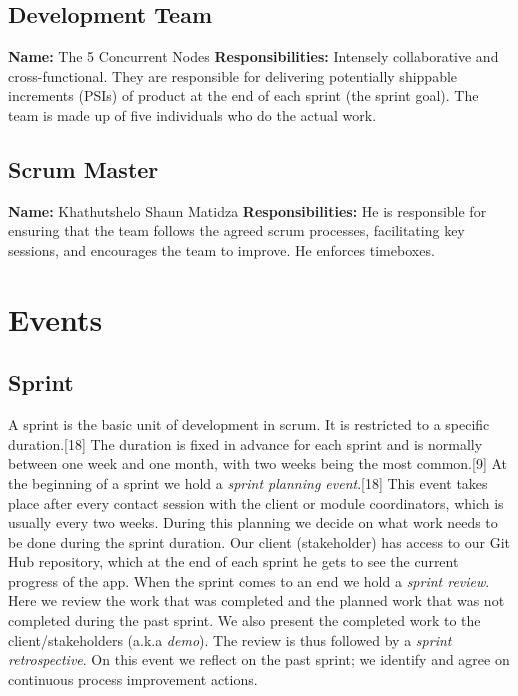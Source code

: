 \documentclass[hidelinks, 12pt, oneside]{article}
\begin{document}
 	\subsection{Development Team}
 	\textbf{Name:} The 5 Concurrent Nodes\newline
	\textbf{Responsibilities:} Intensely collaborative and cross-functional. They are responsible for delivering potentially shippable increments (PSIs) of product at the end of each sprint (the sprint goal). 
	The team
	is made up of five individuals who do the actual work.
	\subsection{Scrum Master}
 	\textbf{Name:} Khathutshelo Shaun Matidza\newline
	\textbf{Responsibilities:} He is responsible for ensuring that the team follows the agreed scrum processes, facilitating key sessions, and encourages 
	the team to improve. He enforces timeboxes.\newpage
	
	\section{Events}
	\subsection{Sprint}
	A sprint is the basic unit of development in scrum. It is restricted to a specific duration.[18] The duration is fixed in advance for each sprint and is 
	normally between one week and one month, with two weeks being the most common.[9]\newline\newline
	At the beginning of a sprint we hold a \emph{sprint planning event}.[18] This event takes place after every contact session with the client or module coordinators,
	which is usually every two weeks. During this planning we decide on what work needs to be done during the sprint duration. Our client (stakeholder) has access 
	to our Git Hub repository, which at the end of each sprint he gets to see the current progress of the app.\newline
	When the sprint comes to an end we hold a \emph{sprint review}. Here we review the work that was completed and the planned work that was not completed during the 
	past sprint. We also present the completed work to the client/stakeholders (a.k.a \emph{demo}).\newline
	The review is thus followed by a \emph{sprint retrospective}. On this event we reflect on the past sprint; we identify and agree on continuous process improvement actions. 
\end{document}
